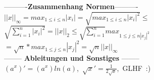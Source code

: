 ----------\textbf{Zusammenhang Normen}----------\
\mbox{$||x||_{\infty} = max_{1 \leq i \leq n}|x_i| = \sqrt{max_{1 \leq i \leq n}|x_i|^2}\leq$} \\
\mbox{$\sqrt{\sum_{i=1}^n|x_i|^2} = ||x||_2 \leq \sqrt{\sum_{i=1}^n} max_{1 \leq j \leq n |x_j|^2}$}\\
\mbox{$= \sqrt{n}*max_{1 \leq j \leq n}|x_j|^2 = \sqrt{n}||x||_{\infty}$}\\
-------- \textbf{Ableitungen und Sonstiges} --------\\
\mbox{$(a^x)' = (a^x) ln(a)$, \hspace{1.5mm}$\sqrt{x}' = \frac{1}{2\sqrt{x}}$, \hspace{1.5mm} GLHF :)}